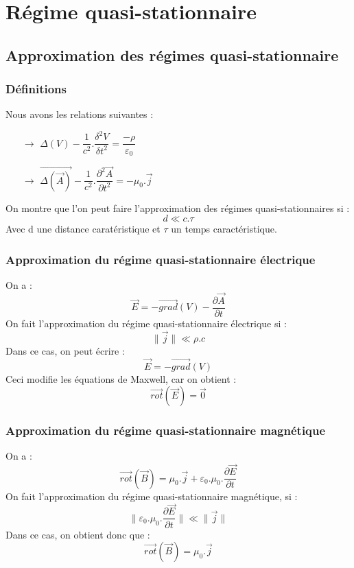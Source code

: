 \chapter{Régime quasi-stationnaire}
\section{Approximation des régimes quasi-stationnaire}
\subsection{Définitions}
Nous avons les relations suivantes :\\ 
\begin{itemize}
 \item[$\rightarrow$] $\Delta(V) - \dfrac{1}{c^2}.\dfrac{\delta^2 V}{\delta t^2} = \dfrac{-\rho}{\varepsilon_0}$\\
 \item[$\rightarrow$] $\overrightarrow{\Delta(\overrightarrow{A})} - \dfrac{1}{c^2}.\dfrac{\partial^2 \overrightarrow{A}}{\partial t^2} = -\mu_0.\overrightarrow{j}$\\
\end{itemize}
On montre que l'on peut faire l'approximation des régimes quasi-stationnaires si : 
$$d \ll c.\tau$$
Avec d une distance caratéristique et $\tau$ un temps caractéristique.
\subsection{Approximation du régime quasi-stationnaire électrique}
On a :
$$\overrightarrow{E} = - \overrightarrow{grad}(V) - \dfrac{\partial \overrightarrow{A}}{\partial t}$$
On fait l'approximation du régime quasi-stationnaire électrique si : 
$$\parallel \overrightarrow{j} \parallel \ll \rho.c$$
Dans ce cas, on peut écrire : 
$$\overrightarrow{E} = - \overrightarrow{grad}(V)$$
Ceci modifie les équations de Maxwell, car on obtient :
$$\overrightarrow{rot}(\overrightarrow{E}) = \overrightarrow{0}$$
\subsection{Approximation du régime quasi-stationnaire magnétique}
On a : 
$$\overrightarrow{rot}(\overrightarrow{B}) = \mu_0.\overrightarrow{j}+\varepsilon_0.\mu_0.\dfrac{\partial \overrightarrow{E}}{\partial t}$$
On fait l'approximation du régime quasi-stationnaire magnétique, si : 
$$\parallel \varepsilon_0.\mu_0.\dfrac{\partial \overrightarrow{E}}{\partial t} \parallel \ll \parallel \overrightarrow{j}\parallel$$
Dans ce cas, on obtient donc que : 
$$\overrightarrow{rot}(\overrightarrow{B}) = \mu_0.\overrightarrow{j}$$
